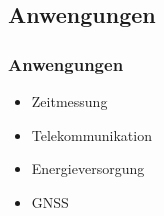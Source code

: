 
\subsection{Anwengungen}
\begin{frame}
  \frametitle{Anwengungen}

  \begin{itemize}
  \item Zeitmessung
  \item Telekommunikation
  \item Energieversorgung
  \item GNSS
  \end{itemize}
\end{frame}





